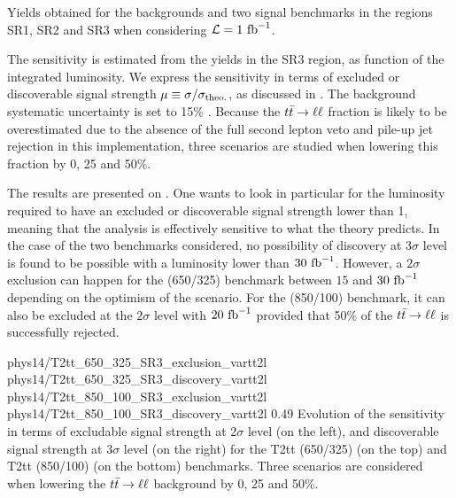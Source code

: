     \begin{table}[h!]
        \centering
        
        \caption{Yields obtained for the backgrounds and two signal benchmarks in
                 the regions SR1, SR2 and SR3 when considering
                 $\mathcal{L} = 1~\text{fb}^{-1}$. \label{tab:phys14SignalRegions}}
    \end{table}

   The sensitivity is estimated from the yields in the SR3 region, as function
   of the integrated luminosity. We express the sensitivity in terms of excluded or
   discoverable signal strength $\mu \equiv \sigma / \sigma_\text{theo.}$, as
   discussed in . The background systematic uncertainty
   is set to 15\% . Because the $t\bar{t} \rightarrow \ell \ell$ fraction is likely to be overestimated
   due to the absence of the full second lepton veto and pile-up jet rejection in
   this implementation, three scenarios are studied when lowering this fraction by 0,
   25 and 50\%.

   The results are presented on .
   One wants to look in particular for the luminosity required to have an excluded or
   discoverable signal strength lower than 1, meaning that the analysis is effectively
   sensitive to what the theory predicts. In the case of the two benchmarks considered,
   no possibility of discovery at 3$\sigma$ level is found to be possible with
   a luminosity lower than $30~\text{fb}^{-1}$. However, a $2\sigma$ exclusion can happen for
   the (650/325) benchmark between $15$ and $30~\text{fb}^{-1}$ depending on the optimism of the
   scenario. For the (850/100) benchmark, it can also be excluded at the $2\sigma$ level
   with $20~\text{fb}^{-1}$ provided that 50\% of the $t\bar{t} \rightarrow \ell \ell$ is successfully rejected.

                     {phys14/T2tt_650_325_SR3_exclusion_vartt2l}
                     {phys14/T2tt_650_325_SR3_discovery_vartt2l}
                     {phys14/T2tt_850_100_SR3_exclusion_vartt2l}
                     {phys14/T2tt_850_100_SR3_discovery_vartt2l}
                     {0.49}
                     {Evolution of the sensitivity in terms of excludable signal strength
                     at 2$\sigma$ level (on the left), and discoverable signal strength
                     at 3$\sigma$ level (on the right) for the T2tt (650/325) (on the top)
                     and T2tt (850/100) (on the bottom) benchmarks. Three scenarios are
                     considered when lowering the $t\bar{t} \rightarrow \ell \ell$ background by 0, 25 and 50\%.}

